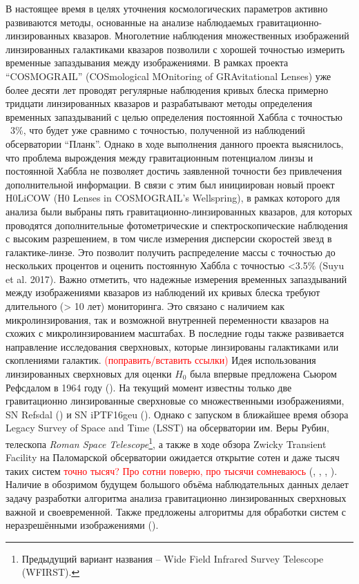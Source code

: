 В настоящее время в целях уточнения космологических параметров активно развиваются методы, основанные на анализе наблюдаемых гравитационно-линзированных квазаров. Многолетние наблюдения множественных изображений линзированных галактиками квазаров позволили с хорошей точностью измерить временные запаздывания между изображениями. В рамках проекта “COSMOGRAIL” (COSmological MOnitoring of GRAvitational Lenses) уже более десяти лет проводят регулярные наблюдения кривых блеска примерно тридцати линзированных квазаров и разрабатывают методы определения временных запаздываний с целью определения постоянной Хаббла с точностью ~3\%, что будет уже сравнимо с точностью, полученной из наблюдений обсерватории “Планк”. Однако в ходе выполнения данного проекта выяснилось, что проблема вырождения между гравитационным потенциалом линзы и постоянной Хаббла не позволяет достичь заявленной точности
без привлечения дополнительной информации. В связи с этим был инициирован новый проект H0LiCOW (H0 Lenses in COSMOGRAIL's Wellspring), в рамках которого для анализа были выбраны пять гравитационно-линзированных квазаров, для которых проводятся дополнительные фотометрические и спектроскопические наблюдения с высоким разрешением, в том числе измерения дисперсии скоростей звезд в галактике-линзе. Это позволит получить распределение массы с точностью до нескольких процентов и оценить постоянную Хаббла с точностью <3.5\% (Suyu et al. 2017).   
Важно отметить, что надежные измерения временных запаздываний между изображениями квазаров из наблюдений их кривых блеска требуют длительного (> 10 лет) мониторинга. Это связано с наличием как микролинзирования, так и возможной внутренней переменности квазаров на схожих с микролинзированием масштабах.
В последние годы также развивается направление исследования сверхновых, которые линзированы галактиками или скоплениями галактик. \textcolor{red}{(поправить/вставить ссылки)} Идея использования линзированных сверхновых для оценки $H_0$ была впервые предложена Сьюром Рефсдалом в 1964 году (\cite{refsdal1964}). На текущий момент известны только две гравитационно линзированные сверхновые со множественными изображениями, SN Refsdal (\cite{kelly2014}) и SN iPTF16geu (\cite{goobar2017}). Однако с запуском в ближайшее время обзора Legacy Survey of Space and Time (LSST) на обсерватории им. Веры Рубин, телескопа \textit{Roman Space Telescope}\footnote{Предыдущий вариант названия -- Wide Field Infrared Survey Telescope (WFIRST).}, а также в ходе обзора Zwicky Transient Facility на Паломарской обсерватории ожидается открытие сотен и даже тысяч таких систем \textcolor{red}{точно тысяч? Про сотни поверю, про тысячи сомневаюсь} (\cite{ogurimarshall}, \cite{goldsteinnugent2017}, \cite{veracrubin}, \cite{rst}). Наличие в обозримом будущем большого объёма наблюдательных данных делает задачу разработки алгоритма анализа гравитационно линзированных сверхновых важной и своевременной. Также предложены алгоритмы для обработки систем с неразрешёнными изображениями (\cite{beitunresolved}). 

